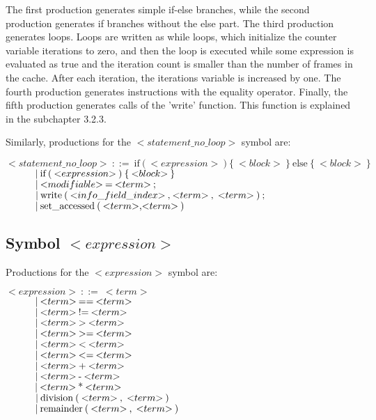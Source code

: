 The first production generates simple if-else branches, while the second production generates if branches without the else part. The third production generates loops. Loops are written as while loops, which initialize the counter variable iterations to zero, and then the loop is executed while some expression is evaluated as true and the iteration count is smaller than the number of frames in the cache. After each iteration, the iterations variable is increased by one. The fourth production generates instructions with the equality operator. Finally, the fifth production generates calls of the 'write' function. This function is explained in the subchapter 3.2.3.

Similarly, productions for the ${<}statement\_no\_loop{>}$ symbol are:

\noindent
$ {<}statement\_no\_loop{>}\:::=\:\text{if}\:\text{(}\:{<}expression{>}\:\text{)}\:\text{\{}\:{<}block{>}\:\text{\}}\:\text{else}\:\text{\{}\:{<}block{>}\:\text{\}} $\\
$ \indent\indent |\:\text{if}\:\text{(}\:{<}expression{>}\:\text{)}\:\text{\{}\:{<}block{>}\:\text{\}}$\\
$ \indent\indent |\:{<}modifiable{>}\:\text{=}\:{<}term{>}\:\text{;} $\\
$ \indent\indent |\:\text{write}\:\text{(}\:{<}info\_field\_index{>}\:\text{,}\:{<}term{>}\:\text{,}\:\:{<}term{>}\:\text{)}\:\text{;} $\\
$ \indent\indent |\:\text{set\_accessed}\:\text{(}\:{<}term{>}\text{,}{<}term{>}\:\text{)}$

\subsection{Symbol ${<}expression{>}$}
Productions for the ${<}expression{>}$ symbol are:

\noindent
$ {<}expression{>}\:::=\:{<}term{>} $\\
$ \indent\indent |\:{<}term{>}\:\text{==}\:{<}term{>} $\\
$ \indent\indent |\:{<}term{>}\:\text{!=}\:{<}term{>} $\\
$ \indent\indent |\:{<}term{>}\:\text{>}\:{<}term{>} $\\
$ \indent\indent |\:{<}term{>}\:\text{>=}\:{<}term{>} $\\
$ \indent\indent |\:{<}term{>}\:\text{<}\:{<}term{>} $\\
$ \indent\indent |\:{<}term{>}\:\text{<=}\:{<}term{>} $\\
$ \indent\indent |\:{<}term{>}\:\text{+}\:{<}term{>} $\\
$ \indent\indent |\:{<}term{>}\:\text{-}\:{<}term{>} $\\
$ \indent\indent |\:{<}term{>}\:\text{*}\:{<}term{>} $\\
$ \indent\indent |\:\text{division}\:\text{(}\:{<}term{>}\:\text{,}\:\:{<}term{>}\:\text{)} $\\
$ \indent\indent |\:\text{remainder}\:\text{(}\:{<}term{>}\:\text{,}\:\:{<}term{>}\:\text{)} $

